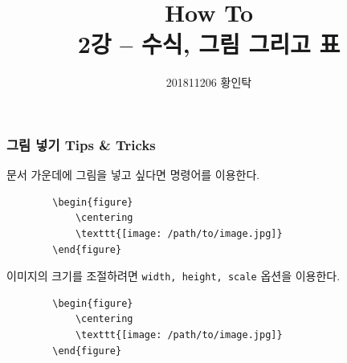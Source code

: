 


\title{How To \latex{} \\ \normalsize \textnormal{2강 -- 수식, 그림 그리고 표}}
\author{201811206 황인탁}


\maketitle


\begin{frame}[fragile]
    \frametitle{그림 넣기 Tips \& Tricks}

    문서 가운데에 그림을 넣고 싶다면 \texttt{\centering} 명령어를 이용한다.
    \begin{verbatim}
        \begin{figure}
            \centering
            \texttt{[image: /path/to/image.jpg]}
        \end{figure}
    \end{verbatim}

    이미지의 크기를 조절하려면 \texttt{width, height, scale} 옵션을 이용한다.
    \begin{verbatim}
        \begin{figure}
            \centering
            \texttt{[image: /path/to/image.jpg]}
        \end{figure}
    \end{verbatim}

\end{frame}

